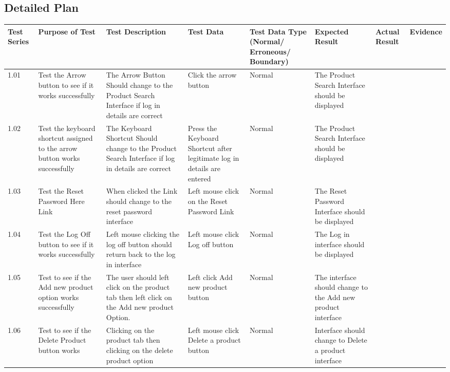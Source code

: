 \begin{python}
\begin{landscape}
\begin{center}
\begin{tabular}{|p{2cm}|p{5cm}|p{5cm}|p{4cm}|}
    \end{tabular}
\end{center}

\subsection{Detailed Plan}
\pagebreak

\begin{flushleft}
    \begin{longtable}{|p{1.5cm}|p{2.5cm}|p{2.5cm}|p{2cm}|p{2cm}|p{2cm}|p{2cm}|p{2cm}|}
        \hline
        \textbf{Test Series} & \textbf{Purpose of Test} & \textbf{Test Description} & \textbf{Test Data} & \textbf{Test Data Type (Normal/ Erroneous/ Boundary)} & \textbf{Expected Result} & \textbf{Actual Result} & \textbf{Evidence}\\ \hline
	1.01 & Test the Arrow button to see if it works successfully & The Arrow Button Should change to the Product Search Interface if log in details are correct & Click the arrow button & Normal & The Product Search Interface should be displayed &&  \\ \hline
	1.02 & Test the keyboard shortcut assigned to the arrow button works successfully & The Keyboard Shortcut Should change to the Product Search Interface if log in details are correct & Press the Keyboard Shortcut after legitimate log in details are entered &  Normal &The Product Search Interface should be displayed &&  \\ \hline
	1.03 & Test the Reset Password Here Link & When clicked the Link should change to the reset password interface & Left mouse click on the Reset Password Link &  Normal & The Reset Password Interface should be displayed &&  \\ \hline
	1.04 & Test the Log Off button to see if it works successfully & Left mouse clicking the log off button should return back to the log in interface & Left mouse click Log off button &  Normal & The Log in interface should be displayed && \\ \hline
	1.05 & Test to see if the Add new product option works successfully & The user should left click on the product tab then left click on the Add new product Option. & Left click Add new product button &  Normal &  The interface should change to the Add new product interface&& \\ \hline
	1.06 & Test to see if the Delete Product button works & Clicking on the product tab then clicking on the delete product option & Left mouse click Delete a product button &  Normal & Interface should change to Delete a product interface&& \\ \hline

\end{longtable}
\end{flushleft}
\end{landscape}
\end{python}
